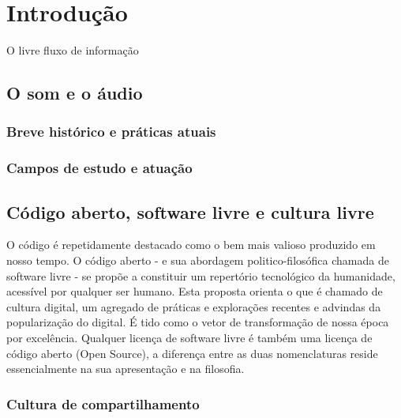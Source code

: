 \chapter{Introdução} %
\label{cap:intro} %

O livre fluxo de informação


\section{O som e o áudio}

\subsection{Breve histórico e práticas atuais}

\subsection{Campos de estudo e atuação}

\section{Código aberto, software livre e cultura livre} %

O código é repetidamente destacado como o bem mais valioso produzido em nosso tempo.
O código aberto - e sua abordagem politico-filosófica chamada de software livre -
se propõe a constituir um repertório tecnológico da humanidade, acessível por
qualquer ser humano. Esta proposta orienta o que é chamado de cultura digital,
um agregado de práticas e explorações recentes e advindas da popularização do digital.
É tido como o vetor de transformação de nossa época por excelência.
Qualquer licença de software livre é também uma licença de código aberto (Open Source), a diferença entre as duas nomenclaturas reside essencialmente na sua apresentação e na filosofia.




\subsection{Cultura de compartilhamento} %
\label{sec:soft_compar} %

